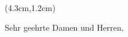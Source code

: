 \documentclass[DINmtext, pagenumber=false, parskip=half,%
               fromalign=left, fromphone=true,%
               fromemail=true, fromurl=true, %
               fromlogo=true, fromrule=false,
               firstfoot=false,%
               subject=beforeopening,%
               ]{scrlttr2}
\def\openingtext{Sehr geehrter Herr \usekomavar{toname},}
\def\openingtext{Sehr geehrte Frau \usekomavar{toname},}
\def\openingtext{Sehr geehrte Damen und Herren,}
\def\openingtext{Sehr geehrte Damen und Herren,}
\begin{document}
\begin{letter}{}
\begin{textblock*}{3cm}(4.3cm,1.2cm)
\end{textblock*}
\opening{\openingtext}
\lhead{}
\thispagestyle{fancy}



\end{letter}
 
\end{document}
